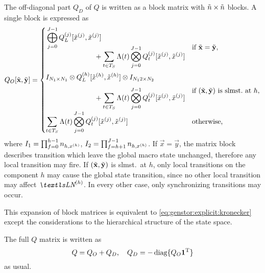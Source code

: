 The off-diagonal part $Q_D$ of $Q$ is written as a block matrix with
$\tilde{n} \times \tilde{n}$ blocks. A single block is expressed as
\begin{equation}
  Q_O[\macro{\vec{x}}, \macro{\vec{y}}] = \begin{cases}
    \begin{multlined}[c][7cm]
      \bigkrplus_{j = 0}^{J - 1}
      \loc{Q_L}{j}[\loc{\macro{x}}{j}, \loc{\macro{x}}{j}]\\[-4.5ex]
      + \sum_{t \in T_S} \Lambda(t) \bigkrtimes_{j = 0}^{J - 1}
      \loc{Q_t}{j}[\loc{\macro{x}}{j}, \loc{\macro{x}}{j}]
    \end{multlined}
    & \text{if $\macro{\vec{x}} = \macro{\vec{y}}$,} \\[6.5ex]
    \begin{multlined}[c][7cm]
      I_{N_1 \times N_1} \krtimes
      \loc{Q_L}{h}[\loc{\macro{x}}{h}, \loc{\macro{x}}{h}] \krtimes
      I_{N_12\times N_2} \\[-1.5ex]
      + \sum_{t \in T_S} \Lambda(t) \bigkrtimes_{j = 0}^{J - 1}
      \loc{Q_t}{j}[\loc{\macro{x}}{j}, \loc{\macro{x}}{j}]
    \end{multlined}
    & \text{if
      $(\macro{\vec{x}}, \macro{\vec{y}})$ is slmst.~at $h$,} \\[5ex]
    \displaystyle \sum_{t \in T_S} \Lambda(t) \bigkrtimes_{j = 0}^{J - 1}
      \loc{Q_t}{j}[\loc{\macro{x}}{j}, \loc{\macro{x}}{j}] &
      \text{otherwise,}
  \end{cases}
\end{equation}
where $I_1 = \prod_{f = 0}^{h - 1} n_{h, x^{(h)}}$, $I_2 = \prod_{f
  = h + 1}^{J - 1} n_{h, x^{(h)}}$. If $\vec{x} = \vec{y}$, the
matrix block describes transition which leave the global macro state
unchanged, therefore any local transition may fire. If
$(\tilde{\bm{\mathrm{x}}}, \tilde{\bm{\mathrm{y}}})$ is slmst.~at $h$, only local
transitions on the component $h$ may cause the global state
transition, since no other local transition may affect $\LN{h}$. In
every other case, only synchronizing transitions may occur.

This expansion of block matrices is equivalent to
\vref{eq:genstor:explicit:kronecker} except the considerations to the
hierarchical structure of the state space.

The full $Q$ matrix is written as
\begin{equation}
  Q = Q_O + Q_D, \quad Q_D = -\operatorname{diag}\{ Q_O \bm{\mathrm{1}}^{\mathrm{T}} \}
\end{equation}
as usual.

